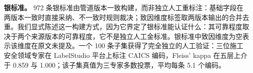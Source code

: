 \documentclass[11pt]{article}
\begin{document}
\textbf{{\cjkfont 银\allowbreak 标\allowbreak 准\allowbreak 。}} 972 {\cjkfont 条\allowbreak 银\allowbreak 标\allowbreak 准\allowbreak 由\allowbreak 管\allowbreak 道\allowbreak 版\allowbreak 本\allowbreak 一\allowbreak 致\allowbreak 构\allowbreak 建\allowbreak ，\allowbreak 而\allowbreak 非\allowbreak 独\allowbreak 立\allowbreak 人\allowbreak 工\allowbreak 重\allowbreak 标\allowbreak 注\allowbreak ：\allowbreak 基\allowbreak 础\allowbreak 字\allowbreak 段\allowbreak 在\allowbreak 两\allowbreak 版\allowbreak 本\allowbreak 一\allowbreak 致\allowbreak 时\allowbreak 直\allowbreak 接\allowbreak 采\allowbreak 纳\allowbreak 、\allowbreak 不\allowbreak 一\allowbreak 致\allowbreak 时\allowbreak 规\allowbreak 则\allowbreak 裁\allowbreak 决\allowbreak ；\allowbreak 致\allowbreak 因\allowbreak 维\allowbreak 度\allowbreak 标\allowbreak 签\allowbreak 取\allowbreak 两\allowbreak 版\allowbreak 本\allowbreak 输\allowbreak 出\allowbreak 的\allowbreak 合\allowbreak 并\allowbreak 去\allowbreak 重\allowbreak 。\allowbreak 我\allowbreak 们\allowbreak 显\allowbreak 式\allowbreak 陈\allowbreak 述\allowbreak 这\allowbreak 一\allowbreak 构\allowbreak 建\allowbreak 方\allowbreak 式\allowbreak ，\allowbreak 因\allowbreak 为\allowbreak 它\allowbreak 界\allowbreak 定\allowbreak 了\allowbreak 银\allowbreak 标\allowbreak 准\allowbreak 能\allowbreak 认\allowbreak 证\allowbreak 什\allowbreak 么\allowbreak ：\allowbreak 其\allowbreak 可\allowbreak 靠\allowbreak 程\allowbreak 度\allowbreak 取\allowbreak 决\allowbreak 于\allowbreak 两\allowbreak 个\allowbreak 来\allowbreak 源\allowbreak 版\allowbreak 本\allowbreak 的\allowbreak 可\allowbreak 靠\allowbreak 程\allowbreak 度\allowbreak ，\allowbreak 它\allowbreak 不\allowbreak 是\allowbreak 独\allowbreak 立\allowbreak 人\allowbreak 工\allowbreak 金\allowbreak 标\allowbreak 准\allowbreak 。\allowbreak 银\allowbreak 标\allowbreak 准\allowbreak 中\allowbreak 致\allowbreak 因\allowbreak 维\allowbreak 度\allowbreak 为\allowbreak 空\allowbreak 表\allowbreak 示\allowbreak 该\allowbreak 维\allowbreak 度\allowbreak 在\allowbreak 原\allowbreak 文\allowbreak 未\allowbreak 提\allowbreak 及\allowbreak 。\allowbreak 一\allowbreak 个} 100 {\cjkfont 条\allowbreak 子\allowbreak 集\allowbreak 获\allowbreak 得\allowbreak 了\allowbreak 完\allowbreak 全\allowbreak 独\allowbreak 立\allowbreak 的\allowbreak 人\allowbreak 工\allowbreak 验\allowbreak 证\allowbreak ：\allowbreak 三\allowbreak 位\allowbreak 施\allowbreak 工\allowbreak 安\allowbreak 全\allowbreak 领\allowbreak 域\allowbreak 专\allowbreak 家\allowbreak 在} LabelStudio {\cjkfont 平\allowbreak 台\allowbreak 上\allowbreak 标\allowbreak 注} CAICS {\cjkfont 编\allowbreak 码\allowbreak ，}Fleiss' kappa {\cjkfont 在\allowbreak 五\allowbreak 层\allowbreak 上\allowbreak 介\allowbreak 于} 0.859 {\cjkfont 与} 1.000{\cjkfont ；\allowbreak 该\allowbreak 子\allowbreak 集\allowbreak 真\allowbreak 值\allowbreak 为\allowbreak 三\allowbreak 专\allowbreak 家\allowbreak 多\allowbreak 数\allowbreak 投\allowbreak 票\allowbreak ，\allowbreak 平\allowbreak 均\allowbreak 每\allowbreak 条} 5.1 {\cjkfont 个\allowbreak 编\allowbreak 码\allowbreak 。}
\end{document}
